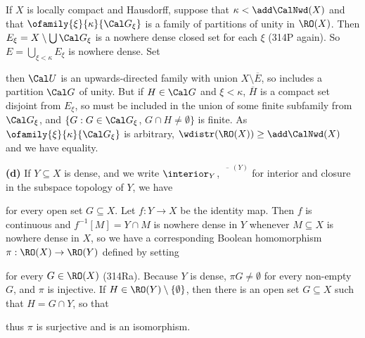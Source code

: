 {\medskip

 If $X$ is locally compact and Hausdorff,
suppose that $\kappa<\add\CalNwd(X)$ and that
$\ofamily{\xi}{\kappa}{\Cal G_{\xi}}$ is a family of partitions of unity
in $\RO(X)$.   Then $E_{\xi}=X\setminus\bigcup\Cal G_{\xi}$ is a
nowhere dense closed set for each $\xi$ (314P again).   So
$E=\bigcup_{\xi<\kappa}E_{\xi}$ is nowhere dense.   Set


\noindent then $\Cal U$ is an upwards-directed family with union
$X\setminus\overline{E}$, so includes a partition $\Cal G$ of unity.
But if $H\in\Cal G$ and $\xi<\kappa$, $\overline{H}$ is a
compact set disjoint from $E_{\xi}$, so must be included in the union of
some finite subfamily from
$\Cal G_{\xi}$, and $\{G:G\in\Cal G_{\xi}$, $G\cap H\ne\emptyset\}$ is
finite.   As
$\ofamily{\xi}{\kappa}{\Cal G_{\xi}}$ is arbitrary,
$\wdistr(\RO(X))\ge\add\CalNwd(X)$ and we have equality.

\medskip

{\bf (d)} If $Y\subseteq X$ is dense, and we write
$\interior_Y$, $\overline{\phantom{W}}^{(Y)}$ for interior and closure
in the subspace topology of $Y$, we have


\noindent for every open set $G\subseteq X$.   Let $f:Y\to X$ be the
identity map.   Then $f$ is continuous and
$f^{-1}[M]=Y\cap M$ is nowhere dense in $Y$ whenever $M\subseteq X$ is
nowhere dense in $X$, so we have a corresponding Boolean homomorphism
$\pi:\RO(X)\to\RO(Y)$ defined by setting


\noindent for every $G\in\RO(X)$ (314Ra).   Because $Y$ is dense,
$\pi G\ne\emptyset$ for every non-empty $G$, and $\pi$ is injective.
If $H\in\RO(Y)\setminus\{\emptyset\}$, then there is an open set
$G\subseteq X$ such that $H=G\cap Y$, so that


\noindent thus $\pi$ is surjective and is an isomorphism.
}%

